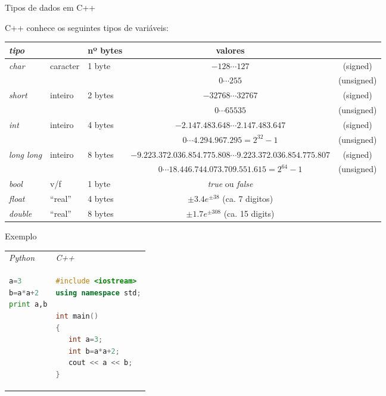 \documentclass[hyperref={colorlinks=true}]{beamer}
\begin{document}
\begin{frame}{Tipos de dados em C++}

C++ conhece os seguintes tipos de variáveis:
{\tiny 
\begin{center}\begin{tabular}{lllcc}
{\it tipo} & & nº bytes & valores & \\\hline\hline
{\it char} & caracter & 1 byte & $-128 \cdots  127$ & (signed)\\[3mm]
           &          &        & $0 \cdots 255$ & (unsigned)\\\hline
{\it short} & inteiro & 2 bytes & $-32768 \cdots 32767$ & (signed)\\[3mm]
  &  &  & $0 \cdots 65535$ & (unsigned) \\\hline
{\it int} & inteiro & 4 bytes & $-2.147.483.648 \cdots  2.147.483.647$ & (signed)\\[3mm]
 & &  & $0 \cdots 4.294.967.295 = 2^{32}-1$ & (unsigned) \\\hline
{\it long long} & inteiro & 8 bytes & $-9.223.372.036.854.775.808 \cdots  9.223.372.036.854.775.807$ & (signed)\\[3mm]
 & &  & $0 \cdots 18.446.744.073.709.551.615 = 2^{64}-1$ & (unsigned) \\\hline 
{\it bool } & v/f & 1 byte & {\it true} ou {\it false}&  \\\hline
{\it float} & ``real'' & 4 bytes & $\pm  3.4e^{\pm 38}$ (ca. 7 digitos)& \\\hline
{\it double} & ``real'' & 8 bytes & $\pm  1.7e^{\pm 308}$ (ca. 15 digits)&  \\\hline
\end{tabular}\end{center}}
\end{frame}


\begin{frame}[fragile]{Exemplo}
\begin{tabular}{ll}
{\it Python} & {\it C++} \\
\begin{minipage}{150px}
\begin{lstlisting}[language=Python]
a=3
b=a*a+2
print a,b
\end{lstlisting}
\end{minipage}
&
\begin{minipage}{150px}
\begin{lstlisting}[language=C++]
#include <iostream>
using namespace std;

int main() 
{
   int a=3;
   int b=a*a+2;
   cout << a << b;
}
\end{lstlisting}
\end{minipage}
\end{tabular}
\end{frame}
\end{document}
